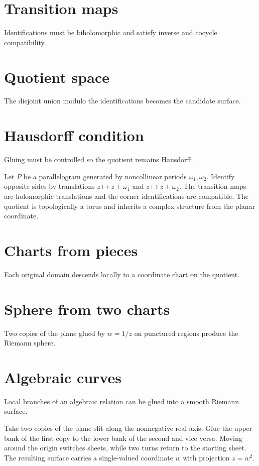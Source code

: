 \section{Transition maps}
Identifications must be biholomorphic and satisfy inverse and cocycle compatibility.

\section{Quotient space}
The disjoint union modulo the identifications becomes the candidate surface.

\section{Hausdorff condition}
Gluing must be controlled so the quotient remains Hausdorff.

\begin{example}\label{ex:iv25-expand-02}
Let \(P\) be a parallelogram generated by noncollinear periods \(\omega_1,\omega_2\). Identify opposite sides by translations \(z\mapsto z+\omega_1\) and \(z\mapsto z+\omega_2\). The transition maps are holomorphic translations and the corner identifications are compatible. The quotient is topologically a torus and inherits a complex structure from the planar coordinate.
\end{example}
\section{Charts from pieces}
Each original domain descends locally to a coordinate chart on the quotient.

\section{Sphere from two charts}
Two copies of the plane glued by $w=1/z$ on punctured regions produce the Riemann sphere.

\section{Algebraic curves}
Local branches of an algebraic relation can be glued into a smooth Riemann surface.

\begin{example}\label{ex:iv25-expand-03}
Take two copies of the plane slit along the nonnegative real axis. Glue the upper bank of the first copy to the lower bank of the second and vice versa. Moving around the origin switches sheets, while two turns return to the starting sheet. The resulting surface carries a single-valued coordinate \(w\) with projection \(z=w^2\).
\end{example}
